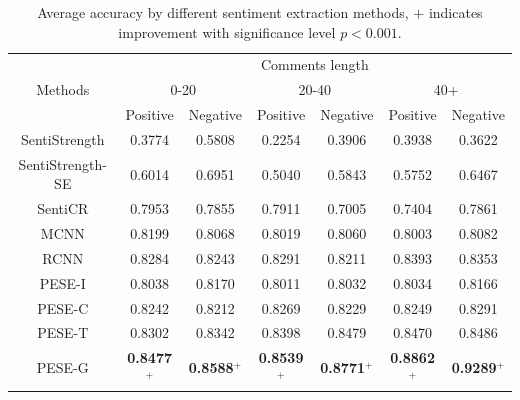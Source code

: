 \documentclass[runningheads]{llncs}
\begin{document}
\begin{table}
\caption{Average accuracy by different sentiment extraction methods, $+$ indicates improvement with significance level $p<0.001$.}\label{table:sentiment classification}
\begin{center}
\begin{tabular}{|c|c|c|c|c|c|c|}
\hline
\multirow{3}{*}{Methods}             & \multicolumn{6}{c|}{Comments length}                                                \\ \cline{2-7} 
                                     & \multicolumn{2}{c|}{0-20} & \multicolumn{2}{c|}{20-40} & \multicolumn{2}{c|}{40+} \\ \cline{2-7} 
                                     & Positive    & Negative    & Positive     & Negative    & Positive     & Negative    \\ \hline
SentiStrength                        & 0.3774      & 0.5808      & 0.2254       & 0.3906      & 0.3938       & 0.3622      \\ \hline
SentiStrength-SE                     & 0.6014      & 0.6951      & 0.5040       & 0.5843      & 0.5752       & 0.6467      \\ \hline
SentiCR                              & 0.7953      & 0.7855      & 0.7911       & 0.7005      & 0.7404       & 0.7861      \\ \hline
MCNN                              & 0.8199      & 0.8068      & 0.8019       & 0.8060      & 0.8003       & 0.8082      \\ \hline
RCNN                              & 0.8284      & 0.8243      & 0.8291       & 0.8211      & 0.8393       & 0.8353      \\ \hline
 PESE-I                      & 0.8038      & 0.8170      & 0.8011       & 0.8032      & 0.8034       & 0.8166      \\ \hline
PESE-C                      & 0.8242      & 0.8212      & 0.8269       & 0.8229      & 0.8249       & 0.8291     \\ \hline
PESE-T                    & 0.8302      & 0.8342      & 0.8398      & 0.8479      & 0.8470       & 0.8486      \\ \hline
PESE-G                      & \textbf{0.8477$^+$}      & \textbf{0.8588$^+$}      & \textbf{0.8539$^+$}       & \textbf{0.8771$^+$}      & \textbf{0.8862$^+$}       & \textbf{0.9289$^+$}      \\ \hline
\end{tabular}
\end{center}
\end{table}
\end{document}
